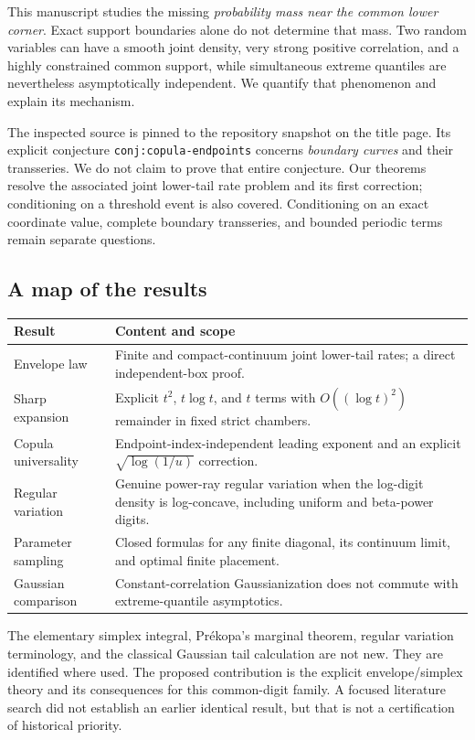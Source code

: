 \documentclass[11pt,a4paper]{article}
\theoremstyle{definition}
\theoremstyle{remark}
\numberwithin{equation}{section}
\begin{document}
This manuscript studies the missing \emph{probability mass near the common
lower corner}. Exact support boundaries alone do not determine that mass.
Two random variables can have a smooth joint density, very strong positive
correlation, and a highly constrained common support, while simultaneous
extreme quantiles are nevertheless asymptotically independent. We quantify
that phenomenon and explain its mechanism.

The inspected source is pinned to the repository snapshot on the title
page. Its explicit conjecture \texttt{conj:copula-endpoints} concerns
\emph{boundary curves} and their transseries. We do not claim to prove that
entire conjecture. Our theorems resolve the associated joint lower-tail
rate problem and its first correction; conditioning on a threshold event is
also covered. Conditioning on an exact coordinate value, complete boundary
transseries, and bounded periodic terms remain separate questions.

\subsection{A map of the results}
\begin{center}
\begin{tabular}{p{}p{}}
\toprule
Result & Content and scope\\
\midrule
Envelope law & Finite and compact-continuum joint lower-tail rates; a direct
independent-box proof.\\[2mm]
Sharp expansion & Explicit $t^2$, $t\log t$, and $t$ terms with
$O((\log t)^2)$ remainder in fixed strict chambers.\\[2mm]
Copula universality & Endpoint-index-independent leading exponent and an
explicit $\sqrt{\log(1/u)}$ correction.\\[2mm]
Regular variation & Genuine power-ray regular variation when the
log-digit density is log-concave, including uniform and beta-power digits.\\[2mm]
Parameter sampling & Closed formulas for any finite diagonal, its continuum
limit, and optimal finite placement.\\[2mm]
Gaussian comparison & Constant-correlation Gaussianization does not commute
with extreme-quantile asymptotics.\\
\bottomrule
\end{tabular}
\end{center}

The elementary simplex integral, Pr\'ekopa's marginal theorem, regular
variation terminology, and the classical Gaussian tail calculation are not
new. They are identified where used. The proposed contribution is the
explicit envelope/simplex theory and its consequences for this common-digit
family. A focused literature search did not establish an earlier identical
result, but that is not a certification of historical priority.
\end{document}
